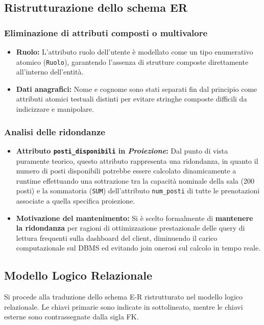 \documentclass[12pt, a4paper]{article}
\begin{document}
\subsection{Ristrutturazione dello schema ER}

\subsubsection{Eliminazione di attributi composti o multivalore}
\begin{itemize}
    \item \textbf{Ruolo:} L'attributo ruolo dell'utente è modellato come un tipo enumerativo atomico (\texttt{Ruolo}), garantendo l'assenza di strutture composte direttamente all'interno dell'entità.
    \item \textbf{Dati anagrafici:} Nome e cognome sono stati separati fin dal principio come attributi atomici testuali distinti per evitare stringhe composte difficili da indicizzare e manipolare.
\end{itemize}

\subsubsection{Analisi delle ridondanze}
\begin{itemize}
    \item \textbf{Attributo \texttt{posti\_disponibili} in \textit{Proiezione}:} Dal punto di vista puramente teorico, questo attributo rappresenta una ridondanza, in quanto il numero di posti disponibili potrebbe essere calcolato dinamicamente a runtime effettuando una sottrazione tra la capacità nominale della sala (200 posti) e la sommatoria (\texttt{SUM}) dell'attributo \texttt{num\_posti} di tutte le prenotazioni associate a quella specifica proiezione.
    \item \textbf{Motivazione del mantenimento:} Si è scelto formalmente di \textbf{mantenere la ridondanza} per ragioni di ottimizzazione prestazionale delle query di lettura frequenti sulla dashboard del client, diminuendo il carico computazionale sul DBMS ed evitando join onerosi sul calcolo in tempo reale.
\end{itemize}
\subsection{Modello Logico Relazionale}
Si procede alla traduzione dello schema E-R ristrutturato nel modello logico relazionale. Le chiavi primarie sono indicate in sottolineato, mentre le chiavi esterne sono contrassegnate dalla sigla FK.
\end{document}

